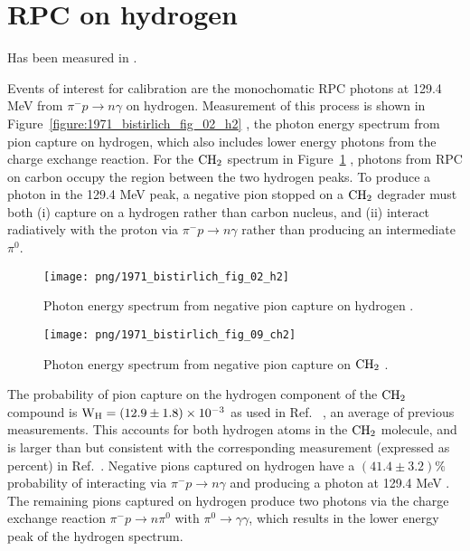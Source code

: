 

\section{RPC on hydrogen}

Has been measured in \cite{RPC_1972_Bistirlich_PhysRevC.5.1867}.

Events of interest for calibration are the monochomatic RPC photons at 129.4 MeV from $\pi^{-} p \to n \gamma$ on
hydrogen. Measurement of this process is shown in 
Figure~\ref{figure:1971_bistirlich_fig_02_h2}
, the photon energy spectrum from pion capture on hydrogen, which also includes lower energy photons from the charge exchange reaction. 
For the $\rm{CH_2}$ spectrum in 
Figure~\ref{figure:1971_bistirlich_fig_09_ch2}
, photons from RPC on carbon occupy the region between the two hydrogen peaks.
To produce a photon in the 129.4 MeV peak, a negative pion stopped on
a $\rm{CH_2}$  degrader must both (i) capture on a hydrogen rather than carbon nucleus, and (ii) interact
radiatively with the proton via $\pi^{-} p \to n \gamma$ rather than producing an intermediate $\pi^0$.


\begin{figure}[H]
 \begin{minipage}{.5\textwidth}
  \texttt{[image: png/1971\_bistirlich\_fig\_02\_h2]}
  \captionsetup{width=.8\linewidth}
  \caption[width=0.9\textwidth]{
      \label{figure:1971_bistirlich_fig_02_h2}
    Photon energy spectrum from negative pion capture on hydrogen \cite{RPC_1972_Bistirlich_PhysRevC.5.1867}.
    }
 \end{minipage}
 \begin{minipage}{.5\textwidth}
  \texttt{[image: png/1971\_bistirlich\_fig\_09\_ch2]}
  \captionsetup{width=.8\linewidth}
  \caption[width=0.9\textwidth]{
  \label{figure:1971_bistirlich_fig_09_ch2}
    Photon energy spectrum from negative pion capture on $\rm{CH_2}$ \cite{RPC_1972_Bistirlich_PhysRevC.5.1867}.
   }
 \end{minipage}
\end{figure}

The probability of pion capture on the hydrogen component of the $\rm{CH_2}$ compound is
$\newline \rm{ W_H = (12.9 \pm 1.8) \times 10^{-3 }}$
 as used in Ref.~\cite{RPC_1991_Harston_PhysRevA.44.103}
 , an average of previous measurements. 
 This accounts for both hydrogen atoms in the $\rm{CH_2}$ molecule, and is larger than but consistent with the
 corresponding measurement (expressed as percent) in Ref.~\cite{RPC_1972_Bistirlich_PhysRevC.5.1867}.
 Negative pions captured on hydrogen have a $ (41.4 \pm 3.2) \% $
 probability of interacting via $\pi^{-} p \to n \gamma$ and producing a photon at 129.4 MeV
 \cite{RPC_1972_Bistirlich_PhysRevC.5.1867}.
 The remaining pions captured on hydrogen produce two photons via the charge exchange reaction
 $ \pi^{-} p \to n \pi^0 $ with $\pi^0  \to \gamma \gamma $,
 which results in the lower energy peak of the hydrogen spectrum. 

